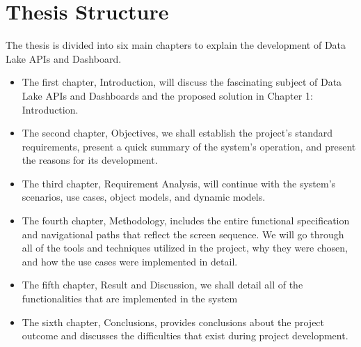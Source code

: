 \section{Thesis Structure}
The thesis is divided into six main chapters to explain the development of Data Lake APIs and Dashboard.
\begin{itemize}
    \item The first chapter, Introduction, will discuss the fascinating subject of Data Lake APIs and Dashboards and the proposed solution in Chapter 1: Introduction.
    \item The second chapter, Objectives, we shall establish the project's standard requirements, present a quick summary of the system's operation, and present the reasons for its development.
    \item The third chapter, Requirement Analysis, will continue with the system's scenarios, use cases, object models, and dynamic models.
    \item The fourth chapter, Methodology, includes the entire functional specification and navigational paths that reflect the screen sequence. We will go through all of the tools and techniques utilized in the project, why they were chosen, and how the use cases were implemented in detail.
    \item The fifth chapter, Result and Discussion, we shall detail all of the functionalities that are implemented in the system
    \item The sixth chapter, Conclusions, provides conclusions about the project outcome and discusses the difficulties that exist during project development.
\end{itemize}
